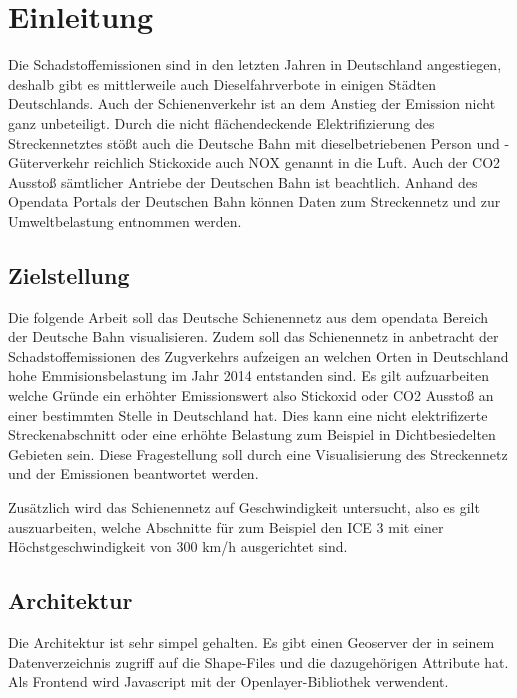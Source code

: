 \section{Einleitung}
Die Schadstoffemissionen sind in den letzten Jahren in Deutschland angestiegen, deshalb gibt es mittlerweile auch Dieselfahrverbote in einigen Städten Deutschlands.\cite{nox}
Auch der Schienenverkehr ist an dem Anstieg der Emission nicht ganz unbeteiligt. Durch die nicht flächendeckende Elektrifizierung des Streckennetztes stößt auch die Deutsche Bahn mit dieselbetriebenen Person und -Güterverkehr reichlich Stickoxide auch NOX genannt in die Luft. Auch der CO2 Ausstoß sämtlicher Antriebe der Deutschen Bahn ist beachtlich. Anhand des Opendata Portals der Deutschen Bahn \cite{dbgeodaten} können Daten zum Streckennetz und zur Umweltbelastung entnommen werden.

\subsection{Zielstellung}
Die folgende Arbeit soll das Deutsche Schienennetz aus dem opendata Bereich der Deutsche Bahn visualisieren. Zudem soll das Schienennetz in anbetracht der Schadstoffemissionen des Zugverkehrs aufzeigen an welchen Orten in Deutschland  hohe Emmisionsbelastung im Jahr 2014 entstanden sind. Es gilt aufzuarbeiten welche Gründe ein erhöhter Emissionswert also Stickoxid oder CO2 Ausstoß an einer bestimmten Stelle in Deutschland hat. Dies kann eine nicht elektrifizerte Streckenabschnitt oder eine erhöhte Belastung zum Beispiel in Dichtbesiedelten Gebieten sein. Diese Fragestellung soll durch eine Visualisierung des Streckennetz und der Emissionen beantwortet werden.


Zusätzlich wird das Schienennetz auf Geschwindigkeit untersucht, also es gilt auszuarbeiten, welche Abschnitte für zum Beispiel den ICE 3 mit einer Höchstgeschwindigkeit von 300 km/h ausgerichtet sind.\cite{ice3}


\subsection{Architektur }
Die Architektur ist sehr simpel gehalten. Es gibt einen Geoserver der in seinem Datenverzeichnis zugriff auf die Shape-Files und die dazugehörigen Attribute hat.
Als Frontend wird Javascript mit der Openlayer-Bibliothek verwendent.
